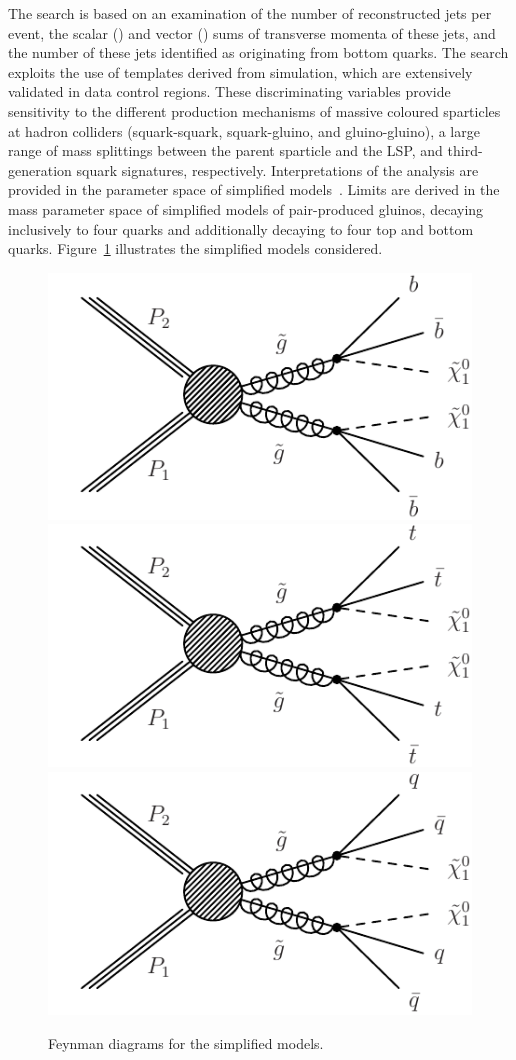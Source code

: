 The search is based on an examination of the number of reconstructed
jets per event, the scalar (\scalht) and vector (\mht) sums of
transverse momenta of these jets, and the number of these jets
identified as originating from bottom quarks. The search exploits the
use of \mht templates derived from simulation, which are extensively
validated in data control regions. These discriminating variables
provide sensitivity to the different production mechanisms of massive
coloured sparticles at hadron colliders (\ie squark-squark,
squark-gluino, and gluino-gluino), a large range of mass splittings
between the parent sparticle and the LSP, and third-generation squark
signatures, respectively. Interpretations of the analysis are provided
in the parameter space of simplified models~\cite{Alwall:2008ag,
  Alwall:2008va, sms}. Limits are derived in the mass parameter space
of simplified models of pair-produced gluinos, decaying inclusively to
four quarks and additionally decaying to four top and bottom
quarks. Figure~\ref{fig:feyn} illustrates the simplified models
considered.

\begin{figure}[thb]
\centering
\includegraphics[width=0.32\linewidth]{T1bbbb.pdf}
\includegraphics[width=0.32\linewidth]{T1tttt.pdf}
\includegraphics[width=0.32\linewidth]{T1qqqq.pdf}
\caption{
Feynman diagrams for the simplified models.
}
\label{fig:feyn}
\end{figure}


